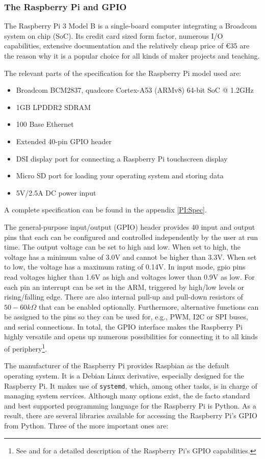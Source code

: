 \documentclass[12pt]{article}
\begin{document}
\subsubsection{The Raspberry Pi and GPIO}
The Raspberry Pi 3 Model B is a single-board computer integrating a Broadcom system on chip (SoC).
Its credit card sized form factor, numerous I/O capabilities, extensive documentation and the relatively cheap price of €35
are the reason why it is a popular choice for all kinds of maker projects and teaching.

The relevant parts of the specification for the Raspberry Pi model used are:
\begin{itemize}
  \item Broadcom BCM2837, quadcore Cortex-A53 (ARMv8) 64-bit SoC @ 1.2GHz
  \item 1GB LPDDR2 SDRAM
  \item 100 Base Ethernet
  \item Extended 40-pin GPIO header
  \item DSI display port for connecting a Raspberry Pi touchscreen display
  \item Micro SD port for loading your operating system and storing data
  \item 5V/2.5A DC power input
\end{itemize}
A complete specification can be found in the appendix \ref{PI:Spec}.

The general-purpose input/output (GPIO) header provides 40 input and output pins that each can be
configured and controlled independently by the user at run time.
The output voltage can be set to high and low. 
When set to high, the voltage has a minimum value of 3.0V and cannot be higher than 3.3V.
When set to low, the voltage has a maximum rating of 0.14V.
In input mode, gpio pins read voltages higher than 1.6V as high and voltages lower than 0.9V as low.
For each pin an interrupt can be set in the ARM, triggered by high/low levels or rising/falling edge.
There are also internal pull-up and pull-down resistors of $50 - 60 k\Omega$ that can be enabled optionally.
Furthermore, alternative functions can be assigned to the pins so they can be used for, e.g., PWM, I2C or SPI buses, and serial connections.
In total, the GPIO interface makes the Raspberry Pi highly versatile and opens up numerous possibilities
for connecting it to all kinds of periphery\footnote{See \cite{PI:GPIO} and \cite{PI:BCM} for a detailed description of the Raspberry Pi's GPIO capabilities.}.

The manufacturer of the Raspberry Pi provides Raspbian as the default operating system.
It is a Debian Linux derivative, especially designed for the Raspberry Pi.
It makes use of \texttt{systemd}, which, among other tasks, is in charge of managing system services.
Although many options exist, the de facto standard and best supported programming language for the Raspberry Pi is Python.
As a result, there are several libraries available for accessing the Raspberry Pi's GPIO from Python.
Three of the more important ones are:
\end{document}
